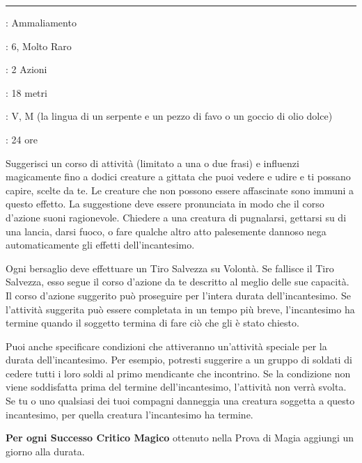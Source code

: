 \begin{multicols}{2}
\smallskip\noindent\rule{\linewidth}{2pt} \hypertarget{Suggestione di Massa}{}\smallskip{}
\noindent
\begin{description}[noitemsep, topsep=0pt, parsep=0pt, partopsep=0pt, leftmargin=0cm, labelwidth=2.8cm]
	\item[\textbf{Lista di Magia}]: Ammaliamento
	\item[\textbf{Livello}]: 6, Molto Raro
	\item[\textbf{T. di Lancio}]: 2 Azioni
	\item[\textbf{Gittata}]: 18 metri
	\item[\textbf{Componenti}]: V, M (la lingua di un serpente e un pezzo di favo o un goccio di olio dolce)
	\item[\textbf{Durata}]: 24 ore
\end{description}

Suggerisci un corso di attività (limitato a una o due frasi) e influenzi magicamente fino a dodici creature a gittata che puoi vedere e udire e ti possano capire, scelte da te. Le creature che non possono essere affascinate sono immuni a questo effetto. La suggestione deve essere pronunciata in modo che il corso d'azione suoni ragionevole. Chiedere a una creatura di pugnalarsi, gettarsi su di una lancia, darsi fuoco, o fare qualche altro atto palesemente dannoso nega automaticamente gli effetti dell'incantesimo.

Ogni bersaglio deve effettuare un Tiro Salvezza su Volontà. Se fallisce il Tiro Salvezza, esso segue il corso d'azione da te descritto al meglio delle sue capacità. Il corso d'azione suggerito può proseguire per l'intera durata dell'incantesimo. Se l'attività suggerita può essere completata in un tempo più breve, l'incantesimo ha termine quando il soggetto termina di fare ciò che gli è stato chiesto.

Puoi anche specificare condizioni che attiveranno un'attività speciale per la durata dell'incantesimo. Per esempio, potresti suggerire a un gruppo di soldati di cedere tutti i loro soldi al primo mendicante che incontrino. Se la condizione non viene soddisfatta prima del termine dell'incantesimo, l'attività non verrà svolta. Se tu o uno qualsiasi dei tuoi compagni danneggia una creatura soggetta a questo incantesimo, per quella creatura l'incantesimo ha termine.

\textbf{Per ogni Successo Critico Magico} ottenuto nella Prova di Magia aggiungi un giorno alla durata.


\end{multicols}
